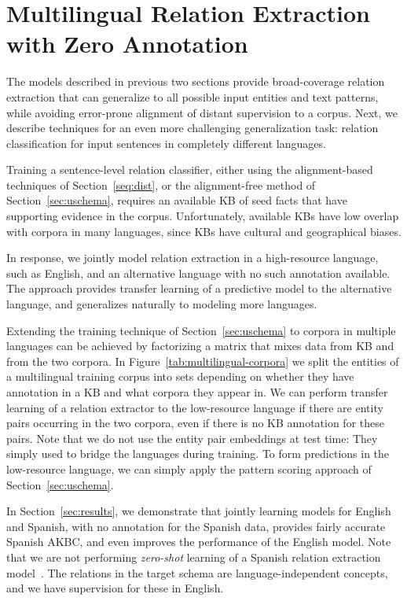 \vspace{-.15cm}
\section{Multilingual Relation Extraction with Zero Annotation}
\vspace{-.15cm}

\label{sec:multilingual}

The models described in previous two sections provide broad-coverage relation extraction that can generalize to all possible input entities and text patterns, while avoiding error-prone alignment of distant supervision to a corpus. Next, we describe techniques for an even more challenging generalization task: relation classification for input sentences in completely different languages. 


Training a sentence-level relation classifier, either using the alignment-based techniques of Section~\ref{seq:dist}, or the alignment-free method of Section~\ref{sec:uschema}, requires an available KB of seed facts that have supporting evidence in the corpus.  Unfortunately, available KBs have low overlap with corpora in many languages, since KBs have cultural and geographical biases. 

In response, we jointly model relation extraction in a high-resource language, such as English, and an alternative language with no such annotation available. The approach provides transfer learning of a predictive model to the alternative language, and generalizes naturally to modeling more languages. 


Extending the training technique of Section~\ref{sec:uschema} to corpora in multiple languages can be achieved by factorizing a matrix that mixes data from KB and from the two corpora. In Figure~\ref{tab:multilingual-corpora} we split the entities of a multilingual training corpus into sets depending on whether they have annotation in a KB and what corpora they appear in. We can perform transfer learning of a relation extractor to the low-resource language if there are entity pairs occurring in the two corpora, even if there is no KB annotation for these pairs. Note that we do not use the entity pair embeddings at test time: They simply used to bridge the languages during training. To form predictions in the low-resource language, we can simply apply the pattern scoring approach of Section~\ref{sec:uschema}. 

In Section~\ref{sec:results}, we demonstrate that jointly learning models for English and Spanish, with no annotation for the Spanish data, provides fairly accurate Spanish AKBC, and even improves the performance of the English model. Note that we are not performing \textit{zero-shot} learning of a Spanish relation extraction model~\citep{zeroshot}. The relations in the target schema are language-independent concepts, and we have supervision for these in English. 

